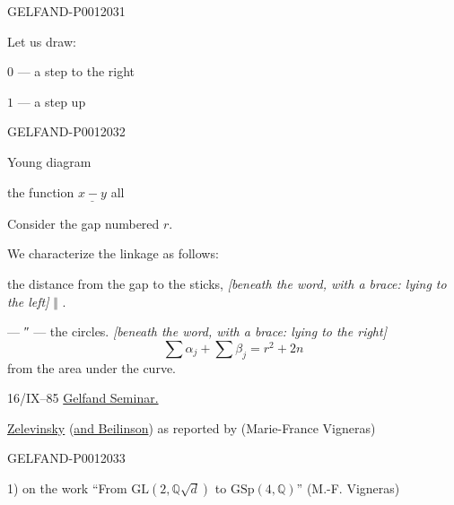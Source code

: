 \begin{GelfandAdjacentEvidence}{GELFAND-P001203}{1}

Let us draw:

$0$ --- a step to the right

$1$ --- a step up

\end{GelfandAdjacentEvidence}
\begin{GelfandAdjacentEvidence}{GELFAND-P001203}{2}


Young diagram

the function $\underline{x-y}$  all

Consider the gap numbered $r$.

We characterize the linkage as follows:

the distance from the gap to the sticks, \textit{[beneath the word, with a brace: lying to the left]} $\Vert$ .

--- ″ --- the circles. \textit{[beneath the word, with a brace: lying to the right]}
\[
\sum\alpha_j+\sum\beta_j=r^2+2n
\]
from the area under the curve.

16/IX--85  \underline{Gelfand Seminar.}

\underline{Zelevinsky} (\underline{and Beilinson}) as reported by  (Marie-France Vigneras)
\end{GelfandAdjacentEvidence}
\begin{GelfandAdjacentEvidence}{GELFAND-P001203}{3}


1) on the work “From \(\mathrm{GL}(2,\mathbb Q\sqrt d)\) to \(\mathrm{GSp}(4,\mathbb Q)\)” (M.-F. Vigneras)
\end{GelfandAdjacentEvidence}
